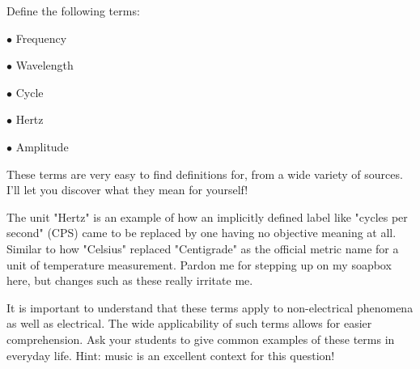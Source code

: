 

Define the following terms:

\medskip 
\item{$\bullet$} Frequency
\item{$\bullet$} Wavelength
\item{$\bullet$} Cycle
\item{$\bullet$} Hertz
\item{$\bullet$} Amplitude
\medskip 







These terms are very easy to find definitions for, from a wide variety of sources.  I'll let you discover what they mean for yourself!







The unit "Hertz" is an example of how an implicitly defined label like "cycles per second" (CPS) came to be replaced by one having no objective meaning at all.  Similar to how "Celsius" replaced "Centigrade" as the official metric name for a unit of temperature measurement.  Pardon me for stepping up on my soapbox here, but changes such as these really irritate me.

It is important to understand that these terms apply to non-electrical phenomena as well as electrical.  The wide applicability of such terms allows for easier comprehension.  Ask your students to give common examples of these terms in everyday life.  Hint: music is an excellent context for this question!




